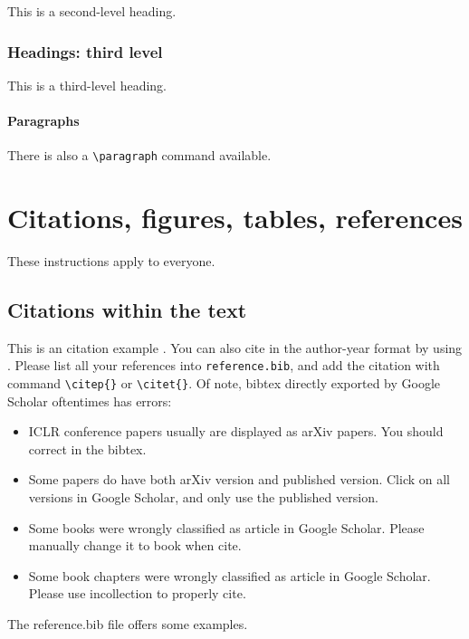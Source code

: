 \documentclass{article}
\begin{document}
This is a second-level heading.

\subsubsection{Headings: third level}

This is a third-level heading.

\paragraph{Paragraphs}

There is also a \verb+\paragraph+ command available.

\section{Citations, figures, tables, references}\label{sec:others}

These instructions apply to everyone.

\subsection{Citations within the text}

This is an citation example \citep{zhu2020dark}. You can also cite in the author-year format by using \citet{zhu2020dark}. Please list all your references into \verb+reference.bib+, and add the citation with command \verb+\citep{}+ or \verb+\citet{}+. Of note, bibtex directly exported by Google Scholar oftentimes has errors:
\begin{itemize}[leftmargin=*,noitemsep,nolistsep,topsep=0pt]
    \item ICLR conference papers usually are displayed as arXiv papers. You should correct in the bibtex.
    \item Some papers do have both arXiv version and published version. Click on all versions in Google Scholar, and only use the published version.
    \item Some books were wrongly classified as article in Google Scholar. Please manually change it to book when cite.
    \item Some book chapters were wrongly classified as article in Google Scholar. Please use incollection to properly cite.
\end{itemize}
The reference.bib file offers some examples.
\end{document}
